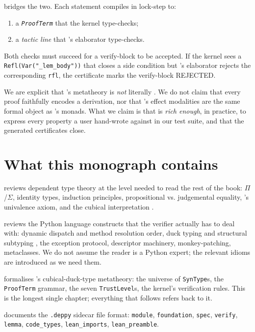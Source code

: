 \PSDL{} bridges the two.  Each \PSDL{} statement compiles in lock-step
to:
\begin{enumerate}[leftmargin=1.7em]
  \item a \emph{\Deppy{} \texttt{ProofTerm}} that the \Deppy{} kernel
    type-checks;
  \item a \emph{\Lean{} tactic line} that \Lean's elaborator type-checks.
\end{enumerate}
Both checks must succeed for a verify-block to be accepted.  If the
\Deppy{} kernel sees a \texttt{Refl(Var("\_lem\_body"))} that closes
a side condition but \Lean's elaborator rejects the corresponding
\texttt{rfl}, the certificate marks the verify-block REJECTED.

We are explicit that \Deppy{}'s metatheory is \emph{not} literally
\CIC.  We do not claim that every \PSDL{} proof faithfully encodes a
\CIC{} derivation, nor that \Deppy{}'s effect modalities are the same
formal object as \Lean{}'s monads.  What we claim is that \PSDL{} is
\emph{rich enough}, in practice, to express every property a user
hand-wrote against \Sympy{} in our test suite, and that the
generated \Lean{} certificates close.

\section{What this monograph contains}
\label{sec:what-this-contains}

 reviews dependent type theory at the level needed
to read the rest of the book: $\Pi$/$\Sigma$, identity types, induction
principles, propositional vs. judgemental equality, \HoTT{}'s
univalence axiom, and the cubical interpretation
\citep{HoTT, CCHM, ABCFHL}.

 reviews the Python language constructs that the
verifier actually has to deal with: dynamic dispatch and method
resolution order, duck typing and structural subtyping
\citep{PEP484, PEP544}, the exception protocol, descriptor
machinery, monkey-patching, metaclasses.  We do not assume the
reader is a Python expert; the relevant idioms are introduced as we
need them.

 formalises \Deppy{}'s cubical-duck-type metatheory:
the universe of \texttt{SynType}s, the \texttt{ProofTerm} grammar,
the seven \texttt{TrustLevel}s, the kernel's verification rules.
This is the longest single chapter; everything that follows refers
back to it.

 documents the \texttt{.deppy} sidecar file format:
\texttt{module}, \texttt{foundation}, \texttt{spec},
\texttt{verify}, \texttt{lemma}, \texttt{code\_types},
\texttt{lean\_imports}, \texttt{lean\_preamble}.

